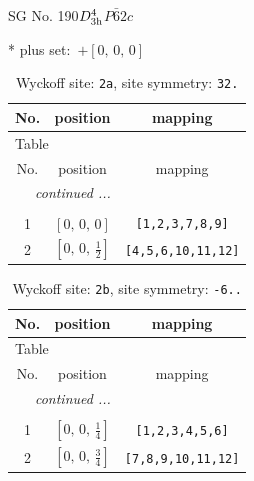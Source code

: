 \documentclass[fleqn,8pt]{jsarticle}
\begin{document}
\setcounter{MaxMatrixCols}{32}

\renewcommand{\tablename}{Table~}
\renewcommand{\figurename}{Figure~}
\begin{center}
\LARGE
SG No. 190\quad$D_{\rm 3h}^{4}$\quad$P\bar{6}2c$\quad[ hexagonal ]
\end{center}
* plus set:\,\,\,$+\left[ 0,\, 0,\, 0 \right]$
\renewcommand{\arraystretch}{1.2}
\begin{longtable}{ccc}
\caption{Wyckoff site: {\tt 2a}, site symmetry: {\tt 32.}}
 \\
 \hline \hline
No. & position & mapping \\ \hline \endfirsthead

\multicolumn{2}{l}{\tablename\ \thetable{}} \\
 \hline \hline
No. & position & mapping \\ \hline \endhead

 \hline \hline
\multicolumn{2}{r}{\footnotesize\it continued ...} \\ \endfoot

 \hline \hline
\multicolumn{2}{r}{} \\ \endlastfoot

1 & $\left[ 0,\, 0,\, 0 \right]$ & {\tt [1,2,3,7,8,9]} \\ \hline
2 & $\left[ 0,\, 0,\, \frac{1}{2} \right]$ & {\tt [4,5,6,10,11,12]} \\
\end{longtable}
\renewcommand{\arraystretch}{1.2}
\begin{longtable}{ccc}
\caption{Wyckoff site: {\tt 2b}, site symmetry: {\tt -6..}}
 \\
 \hline \hline
No. & position & mapping \\ \hline \endfirsthead

\multicolumn{2}{l}{\tablename\ \thetable{}} \\
 \hline \hline
No. & position & mapping \\ \hline \endhead

 \hline \hline
\multicolumn{2}{r}{\footnotesize\it continued ...} \\ \endfoot

 \hline \hline
\multicolumn{2}{r}{} \\ \endlastfoot

1 & $\left[ 0,\, 0,\, \frac{1}{4} \right]$ & {\tt [1,2,3,4,5,6]} \\ \hline
2 & $\left[ 0,\, 0,\, \frac{3}{4} \right]$ & {\tt [7,8,9,10,11,12]} \\
\end{longtable}
\end{document}
